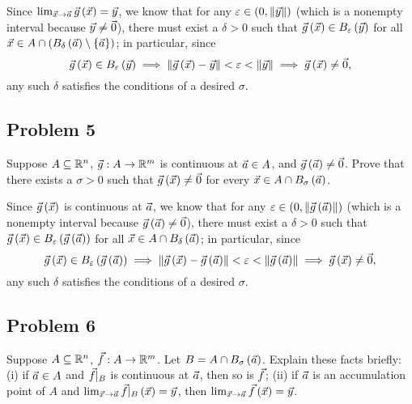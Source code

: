 \documentclass[main.tex]{subfiles}
\begin{document}
\begin{soln}
    Since $\lim_{\vec{x}\to \vec{a}}\vec{g}\left( \vec{x} \right) = \vec{y}$, we know that for any $\varepsilon \in \left( 0, \left\lVert \vec{y} \right\rVert \right)$ (which is a nonempty interval because $\vec{y} \neq \vec{0}$), there must exist a $\delta > 0$ such that $\vec{g}\left( \vec{x} \right)\in B_\varepsilon\left( \vec{y} \right)$ for all $\vec{x}\in A\cap \left( B_\delta\left( \vec{a} \right) \setminus \left\{ \vec{a} \right\} \right)$; in particular, since
    \[\vec{g}\left( \vec{x} \right)\in B_\varepsilon\left( \vec{y} \right)\implies \left\lVert \vec{g}\left( \vec{x} \right) - \vec{y} \right\rVert < \varepsilon < \left\lVert \vec{y} \right\rVert\implies \vec{g}\left( \vec{x} \right) \neq \vec{0},\]
    any such $\delta$ satisfies the conditions of a desired $\sigma$.
\end{soln}
\eject

\subsection{Problem 5}
\begin{claim}
    Suppose $A \subseteq \mathbb R^n$, $\vec{g} : A \to \mathbb R^m$ is continuous at $\vec{a} \in A$, and $\vec{g}\left( \vec{a} \right) \neq \vec{0}$. Prove that there exists a $\sigma > 0$ such that $\vec{g}\left( \vec{x} \right) \neq \vec{0}$ for every $\vec{x} \in A \cap B_\sigma\left( \vec{a} \right)$.
\end{claim}

\begin{soln}
    Since $\vec{g}\left( \vec{x} \right)$ is continuous at $\vec{a}$, we know that for any $\varepsilon \in \left( 0, \left\lVert \vec{g}\left( \vec{a} \right) \right\rVert \right)$ (which is a nonempty interval because $\vec{g}\left( \vec{a} \right) \neq \vec{0}$), there must exist a $\delta > 0$ such that $\vec{g}\left( \vec{x} \right)\in B_\varepsilon\left( \vec{g}\left( \vec{a} \right) \right)$ for all $\vec{x}\in A\cap B_\delta\left( \vec{a} \right)$; in particular, since
    \[\vec{g}\left( \vec{x} \right)\in B_\varepsilon\left( \vec{g}\left( \vec{a} \right) \right)\implies \left\lVert \vec{g}\left( \vec{x} \right) - \vec{g}\left( \vec{a} \right) \right\rVert < \varepsilon < \left\lVert \vec{g}\left( \vec{a} \right) \right\rVert\implies \vec{g}\left( \vec{x} \right) \neq \vec{0},\]
    any such $\delta$ satisfies the conditions of a desired $\sigma$.
\end{soln}
\eject

\subsection{Problem 6}
\begin{claim}
    Suppose $A \subseteq \mathbb R^n$, $\vec{f} : A \to \mathbb R^m$. Let $B = A \cap B_\sigma\left( \vec{a} \right)$. Explain these facts briefly: (i) if $\vec{a} \in A$ and $\vec{f}|_B$ is continuous at $\vec{a}$, then so is $\vec{f}$; (ii) if $\vec{a}$ is an accumulation point of $A$ and $\lim_{\vec{x}\to \vec{a}} \vec{f}|_B\left( \vec{x} \right) = \vec{y}$, then $\lim_{\vec{x}\to \vec{a}} \vec{f}\left( \vec{x} \right) = \vec{y}$.
\end{claim}
\end{document}
